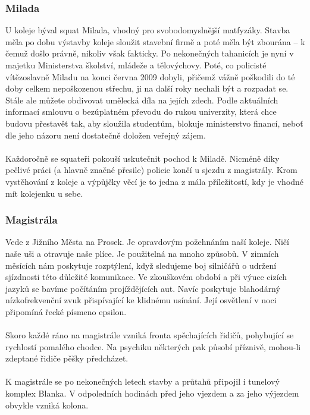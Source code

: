 \subsubsection{Milada}
U koleje býval squat Milada, vhodný pro svobodomyslnější matfyzáky. Stavba měla
po dobu výstavby koleje sloužit stavební firmě a poté měla být zbourána -- k
čemuž došlo právně, nikoliv však fakticky. Po nekonečných tahanicích je nyní v
majetku Ministerstva školství, mládeže a tělovýchovy. Poté, co policisté
vítězoslavně Miladu na konci června 2009 dobyli, přičemž vážně poškodili do té
doby celkem nepoškozenou střechu, ji na další roky nechali být a rozpadat se.
Stále ale můžete obdivovat umělecká díla na jejích zdech. Podle aktuálních
informací smlouvu o bezúplatném převodu do rukou univerzity, která chce budovu
přestavět tak, aby sloužila studentům, blokuje ministerstvo financí, neboť dle
jeho názoru není dostatečně doložen veřejný zájem.
\\\\
Každoročně se squateři pokouší uskutečnit pochod k Miladě. Nicméně díky pečlivé
práci (a hlavně značné přesile) policie končí u sjezdu z magistrály. Krom
vystěhování z koleje a výpůjčky věcí je to jedna z mála příležitostí, kdy je
vhodné mít kolejenku u sebe.


\subsubsection{Magistrála}
Vede z Jižního Města na Prosek. Je opravdovým požehnáním naší koleje. Ničí naše
uši a otravuje naše plíce. Je použitelná na mnoho způsobů. V zimních měsících
nám poskytuje rozptýlení, když sledujeme boj silničářů o udržení sjízdnosti této
důležité komunikace. Ve zkouškovém období a při výuce cizích jazyků se bavíme
počítáním projíždějících aut. Navíc poskytuje blahodárný nízkofrekvenční zvuk
přispívající ke klidnému usínání. Její osvětlení v noci připomíná řecké písmeno
epsilon.
\\\\
Skoro každé ráno na magistrále vzniká fronta spěchajících řidičů, pohybující se
rychlostí pomalého chodce. Na psychiku některých pak působí příznivě, mohou-li
zdeptané řidiče pěšky předcházet.
\\\\
K magistrále se po nekonečných letech stavby a průtahů připojil i tunelový
komplex Blanka. V odpoledních hodinách před jeho vjezdem a za jeho výjezdem
obvykle vzniká kolona.


